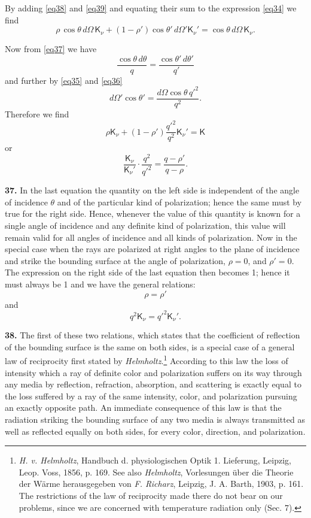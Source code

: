 \documentclass[12pt,oneside]{book}
\begin{document}
By adding \eqref{eq38} and \eqref{eq39} and equating their sum to the expression \eqref{eq34} we find
\begin{equation*}
    \rho\, \cos\theta\, d\Omega\, \mathsf{K}_\nu + (1-\rho') \cos\theta'\, d\Omega' \mathsf{K}_\nu'=\cos\theta\, d\Omega\, \mathsf{K}_\nu.
\end{equation*} \par

Now from \eqref{eq37} we have
$$\frac{\cos\theta\, d\theta}{q}=\frac{\cos\theta'\, d\theta'}{q'}$$
and further by \eqref{eq35} and \eqref{eq36}
$$d\Omega' \cos\theta'=\frac{d\Omega \cos\theta\, q'^2}{q^2}.$$
Therefore we find
$$\rho\mathsf{K}_\nu +(1-\rho')\frac{q'^2}{q^2}\mathsf{K}_\nu'=\mathsf{K}$$
or
$$\frac{\mathsf{K}_\nu}{\mathsf{K}_\nu'}\cdot\frac{q^2}{q'^2}=\frac{q-\rho'}{q-\rho}.$$ \par

\textbf{37.} In the last equation the quantity on the left side is independent of the angle of incidence $\theta$ and of the particular kind of polarization; hence the same must by true for the right side. Hence, whenever the value of this quantity is known for a single angle of incidence and any definite kind of polarization, this value will remain valid for all angles of incidence and all kinds of polarization. Now in the special case when the rays are polarized at right angles to the plane of incidence and strike the bounding surface at the angle of polarization, $\rho=0$, and $\rho'=0$. The expression on the right side of the last equation then becomes 1; hence it must always be 1 and we have the general relations:
\begin{equation}
    \label{eq40}
    \rho=\rho'
\end{equation}
and
\begin{equation}
    \label{eq41}
    q^2\mathsf{K}_\nu=q'^2\mathsf{K}_\nu'.
\end{equation} \par

\textbf{38.} The first of these two relations, which states that the coefficient of reflection of the bounding surface is the same on both sides, is a special case of a general law of reciprocity first stated by \textit{Helmholtz}.\footnote{\textit{H. v. Helmholtz}, Handbuch d. physiologischen Optik 1. Lieferung, Leipzig, Leop. Voss, 1856, p. 169. See also \textit{Helmholtz}, Vorlesungen \"uber die Theorie der W\"arme herausgegeben von \textit{F. Richarz}, Leipzig, J. A. Barth, 1903, p. 161. The restrictions of the law of reciprocity made there do not bear on our problems, since we are concerned with temperature radiation only (Sec. 7).} According to this law the loss of intensity which a ray of definite color and polarization suffers on its way through any media by reflection, refraction, absorption, and scattering is exactly equal to the loss suffered by a ray of the same intensity, color, and polarization pursuing an exactly opposite path. An immediate consequence of this law is that the radiation striking the bounding surface of any two media is always transmitted as well as reflected equally on both sides, for every color, direction, and polarization. \par
\end{document}

